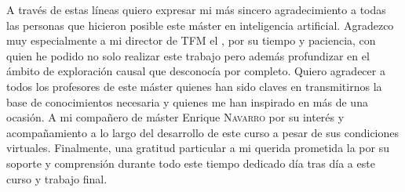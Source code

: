 \documentclass[11pt, oneside, spanish, singlespacing]{MastersDoctoralThesis}
\begin{document}

\renewcommand{\contentsname}{Índice}
\tableofcontents %

\listoffigures %

\listoftables %



\begin{acknowledgements}
\renewcommand{\acknowledgementname}{Agradecimientos}
\addchaptertocentry{\acknowledgementname} %
A través de estas líneas quiero expresar mi más sincero agradecimiento a todas las personas que hicieron posible este máster en inteligencia artificial.
\newline\newline
Agradezco muy especialmente a mi director de TFM el \supname, por su tiempo y paciencia, con quien he podido no solo realizar este trabajo pero además profundizar en el ámbito de exploración causal que desconocía por completo.
\newline\newline
Quiero agradecer a todos los profesores de este máster quienes han sido claves en transmitirnos la base de conocimientos necesaria y quienes me han inspirado en más de una ocasión.
\newline\newline
A mi compañero de máster Enrique \textsc{Navarro} por su interés y acompañamiento a lo largo del desarrollo de este curso a pesar de sus condiciones virtuales.
\newline\newline
Finalmente, una gratitud particular a mi querida prometida la \partnername  por su soporte y comprensión durante todo este tiempo dedicado día tras día a este curso y trabajo final.

\end{acknowledgements}


\end{document}
